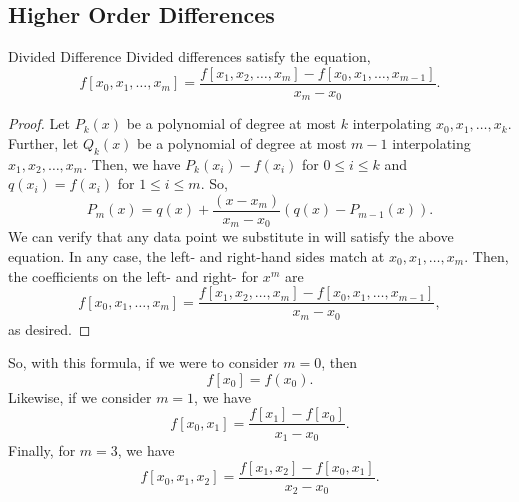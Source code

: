 \documentclass[letterpaper]{article}
\begin{document}
\subsection{Higher Order Differences}
\begin{theorem}{Divided Difference}{}
    Divided differences satisfy the equation,
    \[f[x_0, x_1, \hdots, x_m] = \frac{f[x_1, x_2, \hdots, x_m] - f[x_0, x_1, \hdots, x_{m - 1}]}{x_m - x_0}.\]
\end{theorem}

\begin{proof}
    Let $P_{k}(x)$ be a polynomial of degree at most $k$ interpolating $x_0, x_1, \hdots, x_k$. Further, let $Q_{k}(x)$ be a polynomial of degree at most $m - 1$ interpolating $x_1, x_2, \hdots, x_m$. Then, we have $P_{k}(x_i) - f(x_i)$ for $0 \leq i \leq k$ and $q(x_i) = f(x_i)$ for $1 \leq i \leq m$. So, 
    \[P_{m}(x) = q(x) + \frac{(x - x_m)}{x_m - x_0} (q(x) - P_{m - 1}(x)).\]
    We can verify that any data point we substitute in will satisfy the above equation. In any case, the left- and right-hand sides match at $x_0, x_1, \hdots, x_m$. Then, the coefficients on the left- and right- for $x^m$ are 
    \[f[x_0, x_1, \hdots, x_m] = \frac{f[x_1, x_2, \hdots, x_m] - f[x_0, x_1, \hdots, x_{m - 1}]}{x_m - x_0},\]
    as desired.
\end{proof}

So, with this formula, if we were to consider $m = 0$, then \[f[x_0] = f(x_0).\] Likewise, if we consider $m = 1$, we have \[f[x_0, x_1] = \frac{f[x_1] - f[x_0]}{x_1 - x_0}.\] Finally, for $m = 3$, we have \[f[x_0, x_1, x_2] = \frac{f[x_1, x_2] - f[x_0, x_1]}{x_2 - x_0}.\]
\end{document}
